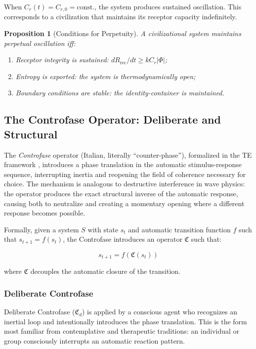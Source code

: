 \documentclass[12pt,a4paper]{article}
\newtheorem{proposition}{Proposition}[section]
\newcommand{\reag}{C_r}
\newcommand{\CF}{\mathfrak{C}}           %
\newcommand{\CFd}{\mathfrak{C}_d}        %
\begin{document}
When $\reag(t) = C_{r,0} = \text{const.}$, the system produces sustained oscillation. This corresponds to a civilization that maintains its receptor capacity indefinitely.

\begin{proposition}[Conditions for Perpetuity]\label{prop:perpetual}
A civilizational system maintains perpetual oscillation iff:
\begin{enumerate}[label=(\alph*)]
    \item Receptor integrity is sustained: $dR_{\mathrm{rec}}/dt \geq k\reag|\Phi|$;
    \item Entropy is exported: the system is thermodynamically open;
    \item Boundary conditions are stable: the identity-container is maintained.
\end{enumerate}
\end{proposition}

\subsection{The Controfase Operator: Deliberate and Structural}

The \textit{Controfase} operator (Italian, literally ``counter-phase''), formalized in the TE framework \cite{controfase}, introduces a phase translation in the automatic stimulus-response sequence, interrupting inertia and reopening the field of coherence necessary for choice. The mechanism is analogous to destructive interference in wave physics: the operator produces the exact structural inverse of the automatic response, causing both to neutralize and creating a momentary opening where a different response becomes possible.

Formally, given a system $S$ with state $s_t$ and automatic transition function $f$ such that $s_{t+1} = f(s_t)$, the Controfase introduces an operator $\CF$ such that:

\begin{equation}\label{eq:controfase}
s_{t+1} = f(\CF(s_t))
\end{equation}

\noindent where $\CF$ decouples the automatic closure of the transition.

\subsubsection{Deliberate Controfase}

Deliberate Controfase ($\CFd$) is applied by a conscious agent who recognizes an inertial loop and intentionally introduces the phase translation. This is the form most familiar from contemplative and therapeutic traditions: an individual or group consciously interrupts an automatic reaction pattern.
\end{document}
